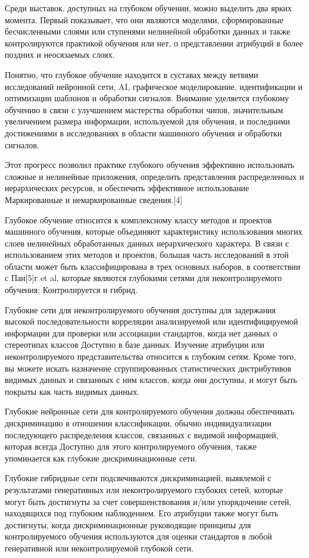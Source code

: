 Среди выставок, доступных на глубоком обучении, можно выделить два ярких момента. Первый показывает, что они являются моделями, сформированные бесчисленными слоями или ступенями нелинейной обработки данных и также контролируются практикой обучения или нет, о представлении атрибуций в более поздних и неосязаемых слоях.

Понятно, что глубокое обучение находится в суставах между ветвями исследований нейронной сети, AI, графическое моделирование, идентификации и оптимизации шаблонов и обработки сигналов. Внимание уделяется глубокому обучению в связи с улучшением мастерства обработки чипов, значительным увеличением размера информации, используемой для обучения, и последними достижениями в исследованиях в области машинного обучения и обработки сигналов.

Этот прогресс позволил практике глубокого обучения эффективно использовать сложные и нелинейные приложения, определить представления распределенных и иерархических ресурсов, и обеспечить эффективное использование Маркированные и немаркированные сведения.[4]

Глубокое обучение относится к комплексному классу методов и проектов машинного обучения, которые объединяют характеристику использования многих слоев нелинейных обработанных данных иерархического характера. В связи с использованием этих методов и проектов, большая часть исследований в этой области может быть классифицирована в трех основных наборов, в соответствии с Пан[5]г et al, которые являются глубокими сетями для неконтролируемого обучения; Контролируется и гибрид.

Глубокие сети для неконтролируемого обучения доступны для задержания высокой последовательности корреляции анализируемой или идентифицируемой информации для проверки или ассоциации стандартов, когда нет данных о стереотипах классов Доступно в базе данных. Изучение атрибуции или неконтролируемого представительства относится к глубоким сетям. Кроме того, вы можете искать назначение сгруппированных статистических дистрибутивов видимых данных и связанных с ним классов, когда они доступны, и могут быть покрыты как часть видимых данных.

Глубокие нейронные сети для контролируемого обучения должны обеспечивать дискриминацию в отношении классификации,
обычно индивидуализации последующего распределения классов, связанных с видимой информацией,
которая всегда Доступно для этого контролируемого обучения, также упоминается как глубокие дискриминационные сети.

Глубокие гибридные сети подсвечиваются дискриминацией, выявлемой с результатами генеративных
или неконтролируемого глубоких сетей, которые могут быть достигнуты за счет совершенствования и/или упорядочение сетей,
находящихся под глубоким наблюдением. Его атрибуции также могут быть достигнуты,
когда дискриминационные руководящие принципы для контролируемого обучения используются
для оценки стандартов в любой генеративной или неконтролируемой глубокой сети.

